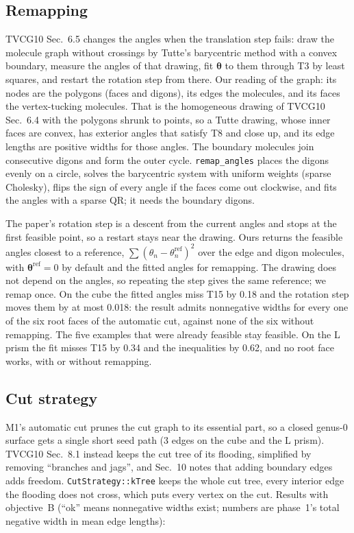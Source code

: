 \documentclass[11pt]{article}
\theoremstyle{definition}
\begin{document}
\subsection{Remapping}

TVCG10 Sec.~6.5 changes the angles when the translation step fails: draw the
molecule graph without crossings by Tutte's barycentric method with a convex
boundary, measure the angles of that drawing, fit $\boldsymbol\theta$ to them
through T3 by least squares, and restart the rotation step from there. Our
reading of the graph: its nodes are the polygons (faces and digons), its edges
the molecules, and its faces the vertex-tucking molecules. That is the
homogeneous drawing of TVCG10 Sec.~6.4 with the polygons shrunk to points, so
a Tutte drawing, whose inner faces are convex, has exterior angles that
satisfy T8 and close up, and its edge lengths are positive widths for those
angles. The boundary molecules join consecutive digons and form the outer
cycle. \texttt{remap\_angles} places the digons evenly on a circle, solves
the barycentric system with uniform weights (sparse Cholesky), flips the sign
of every angle if the faces come out clockwise, and fits the angles with a
sparse QR; it needs the boundary digons.

The paper's rotation step is a descent from the current angles and stops at
the first feasible point, so a restart stays near the drawing. Ours returns
the feasible angles closest to a reference, $\sum(\theta_n - \theta_n^{\mathrm{ref}})^2$
over the edge and digon molecules, with $\boldsymbol\theta^{\mathrm{ref}} = 0$ by
default and the fitted angles for remapping. The drawing does not depend on
the angles, so repeating the step gives the same reference; we remap once.
On the cube the fitted angles miss T15 by 0.18 and the rotation step moves
them by at most 0.018: the result admits nonnegative widths for every one of
the six root faces of the automatic cut, against none of the six without
remapping. The five examples that were already feasible stay feasible. On the
L prism the fit misses T15 by 0.34 and the inequalities by 0.62, and no root
face works, with or without remapping.

\subsection{Cut strategy}

M1's automatic cut prunes the cut graph to its essential part, so a closed
genus-0 surface gets a single short seed path (3 edges on the cube and the L
prism). TVCG10 Sec.~8.1 instead keeps the cut tree of its flooding,
simplified by removing ``branches and jags'', and Sec.~10 notes that adding
boundary edges adds freedom. \texttt{CutStrategy::kTree} keeps the whole cut
tree, every interior edge the flooding does not cross, which puts every
vertex on the cut. Results with objective~B (``ok'' means nonnegative widths
exist; numbers are phase~1's total negative width in mean edge lengths):
\end{document}
